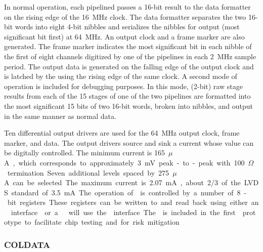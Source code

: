 In normal operation, each pipelined  passes a \num{16}-bit result to the
data formatter on the rising edge of the \SI{16}{MHz} clock.  The data formatter
separates the two 16-bit words into eight \num{4}-bit nibbles and serializes the
nibbles for output (most significant bit first) at \SI{64}{MHz}.  An output
clock and a frame marker are also generated.  The frame marker indicates the most
significant bit in each nibble of the first of eight channels digitized by one
of the  pipelines in each \SI{2}{MHz} sample period.  The output data
is generated on the falling edge of the output clock and is latched by the
  using the rising edge of the same clock.  A second
mode of operation is included for debugging purposes.  In this mode, (\num{2}-bit) raw
stage results from each of the \num{15} stages of one of the two pipelines are formatted
into the most significant \num{15} bits of two \num{16}-bit words, broken into nibbles, and
output in the same manner as normal data.

Ten differential output drivers are used for the \SI{64}{MHz} output clock, frame
marker, and  data.  The output drivers source and sink a current whose
value can be digitally controlled.  The minimum current is \SI{165}{$\mu$A},
which corresponds to approximately \SI{3}{mV} peak-to-peak with \SI{100}{$\Omega$}
termination.  Seven additional levels spaced by \SI{275}{$\mu$A} can be selected.
The maximum current is \SI{2.07}{mA}, about \num{2/3} of the LVDS standard of
\SI{3.5}{mA}.

The operation of  is controlled by a number of \num{8}-bit registers.
These registers can be written to and read back using either an 
interface~\cite{bib:I2C} or a .  will use the  interface.  The
 is included in the first  prototype to facilitate chip testing
and for risk mitigation.


\subsubsection{COLDATA }
\label{sec:fdsp-tpcelec-design-femb-coldata}

